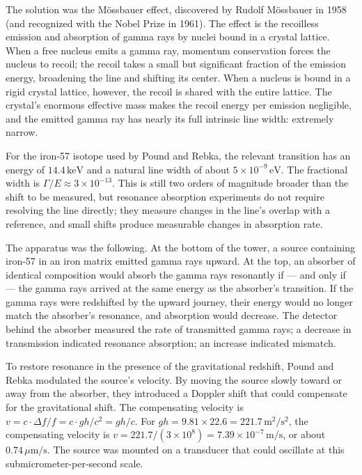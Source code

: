 The solution was the M\"ossbauer effect, discovered by Rudolf M\"ossbauer in 1958
(and recognized with the Nobel Prize in 1961). The effect is the recoilless
emission and absorption of gamma rays by nuclei bound in a crystal lattice.
When a free nucleus emits a gamma ray, momentum conservation forces the
nucleus to recoil; the recoil takes a small but significant fraction of the
emission energy, broadening the line and shifting its center. When a nucleus
is bound in a rigid crystal lattice, however, the recoil is shared with the
entire lattice. The crystal's enormous effective mass makes the recoil energy
per emission negligible, and the emitted gamma ray has nearly its full
intrinsic line width: extremely narrow.

For the iron-57 isotope used by Pound and Rebka, the relevant transition has
an energy of $14{.}4\,\mathrm{keV}$ and a natural line width of about $5 \times
10^{-9}\,\mathrm{eV}$. The fractional width is $\Gamma/E \approx 3 \times
10^{-13}$. This is still two orders of magnitude broader than the shift to
be measured, but resonance absorption experiments do not require resolving
the line directly; they measure changes in the line's overlap with a
reference, and small shifts produce measurable changes in absorption rate.

The apparatus was the following. At the bottom of the tower, a source
containing iron-57 in an iron matrix emitted gamma rays upward. At the top,
an absorber of identical composition would absorb the gamma rays resonantly
if --- and only if --- the gamma rays arrived at the same energy as the
absorber's transition. If the gamma rays were redshifted by the upward
journey, their energy would no longer match the absorber's resonance, and
absorption would decrease. The detector behind the absorber measured the
rate of transmitted gamma rays; a decrease in transmission indicated
resonance absorption; an increase indicated mismatch.

To restore resonance in the presence of the gravitational redshift, Pound
and Rebka modulated the source's velocity. By moving the source slowly
toward or away from the absorber, they introduced a Doppler shift that
could compensate for the gravitational shift. The compensating velocity is
$v = c \cdot \Delta f / f = c \cdot gh/c^2 = gh/c$. For $g h = 9{.}81
\times 22{.}6 = 221{.}7\,\mathrm{m^2/s^2}$, the compensating velocity is
$v = 221{.}7 / (3 \times 10^8) = 7{.}39 \times 10^{-7}\,\mathrm{m/s}$, or
about $0{.}74\,\mu\mathrm{m/s}$. The source was mounted on a transducer
that could oscillate at this submicrometer-per-second scale.

